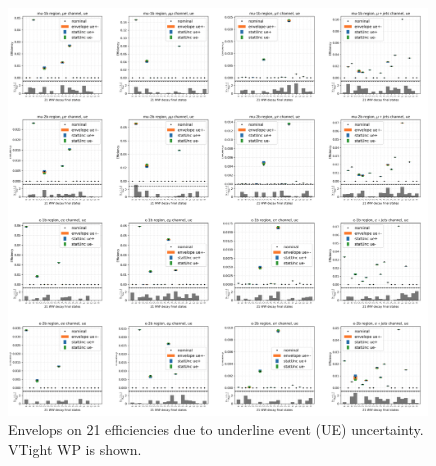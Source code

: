 \begin{figure}
    \centering
    \includegraphics[width=0.99\textwidth]{chapters/Analysis/sectionSystematics/figures/ttTheoretical/ue.png}
    \caption{Envelops on 21 efficiencies due to underline event (UE) uncertainty. VTight WP is shown.}
    \label{fig:analysis:systematics:effAfterCorrUE}
\end{figure}









